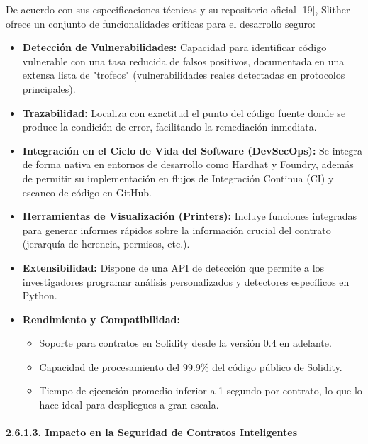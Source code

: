 De acuerdo con sus especificaciones técnicas y su repositorio oficial
{[}19{]}, Slither ofrece un conjunto de funcionalidades críticas para el
desarrollo seguro:

\begin{itemize}
\tightlist
\item
  \textbf{Detección de Vulnerabilidades:} Capacidad para identificar
  código vulnerable con una tasa reducida de falsos positivos,
  documentada en una extensa lista de "trofeos" (vulnerabilidades reales
  detectadas en protocolos principales).
\item
  \textbf{Trazabilidad:} Localiza con exactitud el punto del código
  fuente donde se produce la condición de error, facilitando la
  remediación inmediata.
\item
  \textbf{Integración en el Ciclo de Vida del Software (DevSecOps):} Se
  integra de forma nativa en entornos de desarrollo como Hardhat y
  Foundry, además de permitir su implementación en flujos de Integración
  Continua (CI) y escaneo de código en GitHub.
\item
  \textbf{Herramientas de Visualización (Printers):} Incluye funciones
  integradas para generar informes rápidos sobre la información crucial
  del contrato (jerarquía de herencia, permisos, etc.).
\item
  \textbf{Extensibilidad:} Dispone de una API de detección que permite a
  los investigadores programar análisis personalizados y detectores
  específicos en Python.
\item
  \textbf{Rendimiento y Compatibilidad:}

  \begin{itemize}
  \tightlist
  \item
    Soporte para contratos en Solidity desde la versión 0.4 en adelante.
  \item
    Capacidad de procesamiento del 99.9\% del código público de
    Solidity.
  \item
    Tiempo de ejecución promedio inferior a 1 segundo por contrato, lo
    que lo hace ideal para despliegues a gran escala.
  \end{itemize}
\end{itemize}

\paragraph{2.6.1.3. Impacto en la Seguridad de Contratos
Inteligentes}\label{impacto-en-la-seguridad-de-contratos-inteligentes}

